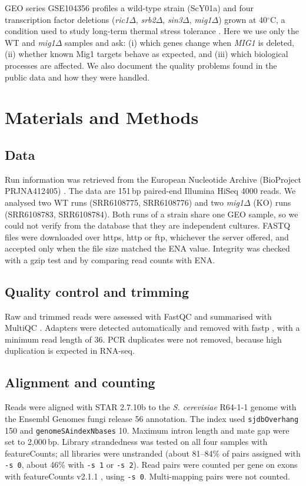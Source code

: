 \documentclass[11pt, a4paper]{article}
\begin{document}
GEO series GSE104356 profiles a wild-type strain (ScY01a) and four transcription factor deletions (\textit{ric1}$\Delta$, \textit{srb2}$\Delta$, \textit{sin3}$\Delta$, \textit{mig1}$\Delta$) grown at 40$^\circ$C, a condition used to study long-term thermal stress tolerance \cite{edgar2002}. Here we use only the WT and \textit{mig1}$\Delta$ samples and ask: (i) which genes change when \textit{MIG1} is deleted, (ii) whether known Mig1 targets behave as expected, and (iii) which biological processes are affected. We also document the quality problems found in the public data and how they were handled.

\section{Materials and Methods}

\subsection{Data}
Run information was retrieved from the European Nucleotide Archive (BioProject PRJNA412405) \cite{leinonen2011}. The data are 151\,bp paired-end Illumina HiSeq 4000 reads. We analysed two WT runs (SRR6108775, SRR6108776) and two \textit{mig1}$\Delta$ (KO) runs (SRR6108783, SRR6108784). Both runs of a strain share one GEO sample, so we could not verify from the database that they are independent cultures. FASTQ files were downloaded over https, http or ftp, whichever the server offered, and accepted only when the file size matched the ENA value. Integrity was checked with a gzip test and by comparing read counts with ENA.

\subsection{Quality control and trimming}
Raw and trimmed reads were assessed with FastQC \cite{andrews2010} and summarised with MultiQC \cite{ewels2016}. Adapters were detected automatically and removed with fastp \cite{chen2018}, with a minimum read length of 36. PCR duplicates were not removed, because high duplication is expected in RNA-seq.

\subsection{Alignment and counting}
Reads were aligned with STAR 2.7.10b \cite{dobin2013} to the \textit{S. cerevisiae} R64-1-1 genome with the Ensembl Genomes fungi release 56 annotation. The index used \texttt{sjdbOverhang} 150 and \texttt{genomeSAindexNbases} 10. Maximum intron length and mate gap were set to 2,000\,bp. Library strandedness was tested on all four samples with featureCounts; all libraries were unstranded (about 81--84\% of pairs assigned with \texttt{-s 0}, about 46\% with \texttt{-s 1} or \texttt{-s 2}). Read pairs were counted per gene on exons with featureCounts v2.1.1 \cite{liao2014}, using \texttt{-s 0}. Multi-mapping pairs were not counted.
\end{document}
